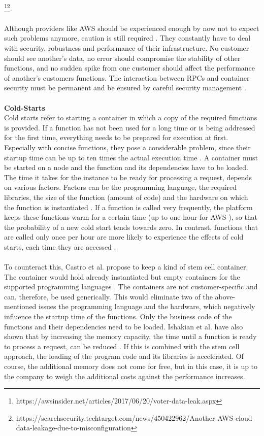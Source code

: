 \documentclass[a4paper,twoside,11pt, pagesize]{scrartcl}
\begin{document}
\begin{spacing}{1.2}
\footnote{https://awsinsider.net/articles/2017/06/20/voter-data-leak.aspx}\footnote{https://searchsecurity.techtarget.com/news/450422962/Another-AWS-cloud-data-leakage-due-to-misconfiguration}.\\\\ Although providers like AWS should be experienced enough by now not to expect such problems anymore, caution is still required \cite{fowler2018serverless}. They constantly have to deal with security, robustness and performance of their infrastructure. No customer should see another's data, no error should compromise the stability of other functions, and no sudden spike from one customer should affect the performance of another's customers functions. The interaction between RPCs and container security must be permanent and be ensured by careful security management \cite{mcgrath2017serverless}.\\\\ \textbf{Cold-Starts}\\ Cold starts refer to starting a container in which a copy of the required functions is provided. If a function has not been used for a long time or is being addressed for the first time, everything needs to be prepared for execution at first. Especially with concise functions, they pose a considerable problem, since their startup time can be up to ten times the actual execution time \cite{shahrad2019architectural}. A container must be started on a node and the function and its dependencies have to be loaded. The time it takes for the instance to be ready for processing a request, depends on various factors. Factors can be the programming language, the required libraries, the size of the function (amount of code) and the hardware on which the function is instantiated \cite{shafiei2020serverless} \cite{jonas2019cloud}. If a function is called very frequently, the platform keeps these functions \glqq warm\grqq{} for a certain time (up to one hour for AWS \cite{roberts2017serverless}), so that the probability of a new cold start tends towards zero. In contrast, functions that are called only once per hour are more likely to experience the effects of cold starts, each time they are accessed \cite{roberts2017serverless}.\\\\ To counteract this, Castro et al. propose to keep a kind of stem cell container. The container would hold already instantiated but empty containers for the supported programming languages \cite{castro2019server}. The containers are not customer-specific and can, therefore, be used generically. This would eliminate two of the above-mentioned issues the programming language and the hardware, which negatively influence the startup time of the functions. Only the business code of the functions and their dependencies need to be loaded. Ishakian et al. have also shown that by increasing the memory capacity, the time until a function is ready to process a request, can be reduced \cite{ishakian2018serving}. If this is combined with the stem cell approach, the loading of the program code and its libraries is accelerated. Of course, the additional memory does not come for free, but in this case, it is up to the company to weigh the additional costs against the performance increases.

\end{spacing}
\end{document}
